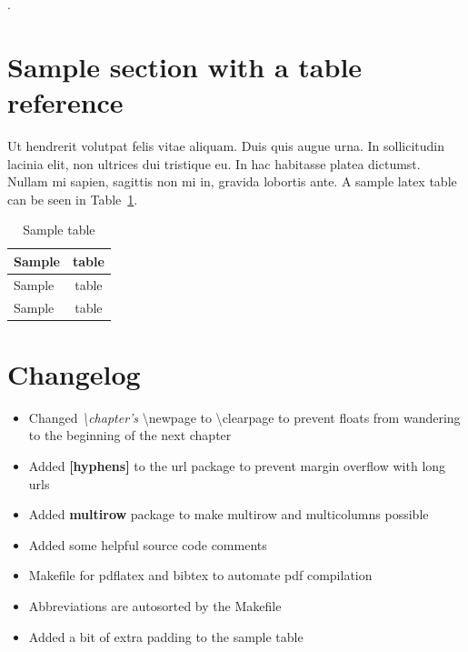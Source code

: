 . \cite{kamara, al-shaer}


\section{Sample section with a table reference}

Ut hendrerit volutpat felis vitae aliquam. Duis quis augue urna. In sollicitudin lacinia elit, 
non ultrices dui tristique eu. In hac habitasse platea dictumst. Nullam mi sapien, sagittis non 
mi in, gravida lobortis ante. A sample latex table can be seen in Table~\ref{tab:sample_table}.


\begin{table}[!ht]
\def\arraystretch{1.1}%
\begin{center}
  \caption{Sample table}
  \label{tab:sample_table}
  \begin{tabular}{| l | c | }
    \hline
    Sample & table \\
    \hline
    Sample & table \\
    Sample & table \\
    \hline
  \end{tabular}

  \end{center}
\end{table}

\section{Changelog}

\begin{itemize}
\item Changed \textit{\textbackslash{chapter's}} \textbackslash{newpage} to 
\textbackslash{clearpage} to prevent floats from wandering to the beginning of the next chapter

\item Added \textbf{[hyphens]} to the url package to prevent margin overflow with 
long urls

\item Added \textbf{multirow} package to make multirow and multicolumns possible

\item Added some helpful source code comments

\item Makefile for pdflatex and bibtex to automate pdf compilation

\item Abbreviations are autosorted by the Makefile

\item Added a bit of extra padding to the sample table
\end{itemize}

